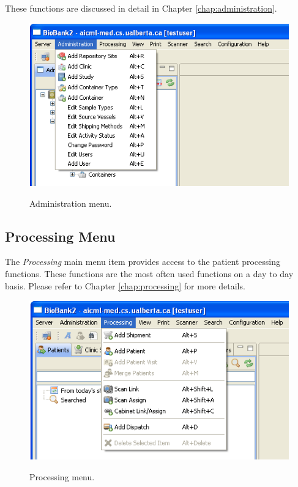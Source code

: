 These functions are discussed in detail in Chapter \ref{chap:administration}.
\begin{figure}[H]
  \centering
  \scalebox{0.5}
	   { \includegraphics*{screenshots/overview/main_menu_administration} }
	   \caption{Administration menu.}
	   \label{fig:main_menu_administration}
\end{figure}

\subsection{Processing Menu}
The \emph{Processing} main menu item provides access to the patient processing
functions. These functions are the most often used functions on a day to day
basis. Please refer to Chapter \ref{chap:processing} for more details.
\begin{figure}[H]
  \centering
  \scalebox{0.5}
	   { \includegraphics*{screenshots/overview/main_menu_processing} }
	   \caption{Processing menu.}
	   \label{fig:main_menu_processing}
\end{figure}

